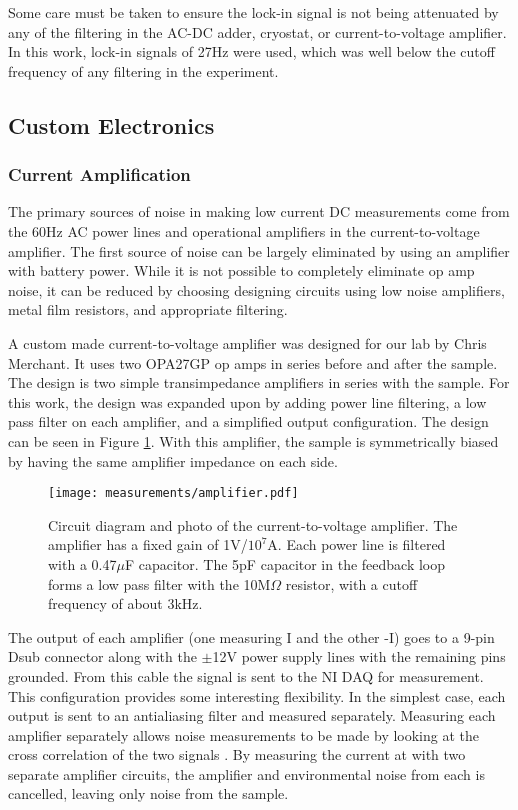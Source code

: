 Some care must be taken to ensure the lock-in signal is not being attenuated by any of the filtering in the AC-DC adder, cryostat, or current-to-voltage amplifier.  In this work, lock-in signals of 27Hz were used, which was well below the cutoff frequency of any filtering in the experiment.

\subsection{Custom Electronics}

\subsubsection*{Current Amplification}
\label{sec:CV_amp}

The primary sources of noise in making low current DC measurements come from the 60Hz AC power lines and operational amplifiers in the current-to-voltage amplifier. The first source of noise can be largely eliminated by using an amplifier with battery power. While it is not possible to completely eliminate op amp noise, it can be reduced by choosing designing circuits using low noise amplifiers, metal film resistors, and appropriate filtering. 

A custom made current-to-voltage amplifier was designed for our lab by Chris Merchant. It uses two OPA27GP op amps in series before and after the sample. The design is two simple transimpedance amplifiers in series with the sample. For this work, the design was expanded upon by adding power line filtering, a low pass filter on each amplifier, and a simplified output configuration. The design can be seen in Figure \ref{fig:current_amp}. With this amplifier, the sample is symmetrically biased by having the same amplifier impedance on each side.

\begin{figure}
    \centering
    \texttt{[image: measurements/amplifier.pdf]}
    \caption{Circuit diagram and photo of the current-to-voltage amplifier. The amplifier has a fixed gain of 1V/$10^7$A. Each power line is filtered with a 0.47$\mu$F capacitor. The 5pF capacitor in the feedback loop forms a low pass filter with the 10M$\Omega$ resistor, with a cutoff frequency of about 3kHz.}
    \label{fig:current_amp}
\end{figure}

The output of each amplifier (one measuring I and the other -I) goes to a 9-pin Dsub connector along with the $\pm$12V power supply lines with the remaining pins grounded. From this cable the signal is sent to the NI DAQ for measurement. This configuration provides some interesting flexibility. In the simplest case, each output is sent to an antialiasing filter and measured separately. Measuring each amplifier separately allows noise measurements to be made by looking at the cross correlation of the two signals \cite{Merchant2009}. By measuring the current at with two separate amplifier circuits, the amplifier and environmental noise from each is cancelled, leaving only noise from the sample.

